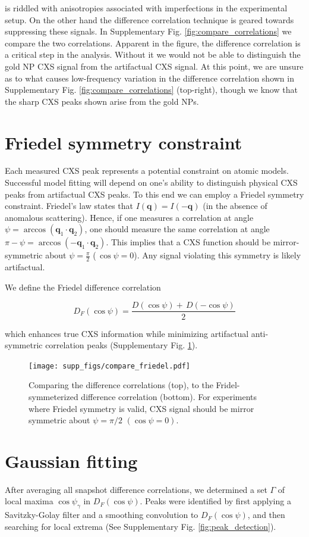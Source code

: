 \documentclass [12pt,fleqn]{article}
\def \be {\begin{equation}}
\def \ee {\end{equation}}
\begin{document}
is riddled with anisotropies associated with imperfections in the experimental setup. On the other hand the difference correlation technique is geared towards suppressing these signals. In  Supplementary Fig. \ref{fig:compare_correlations} we compare the two correlations. Apparent in the figure, the difference correlation is a critical step in the analysis. Without it we would not be able to distinguish the gold NP CXS signal from the artifactual CXS signal. At this point, we are unsure as to what causes low-frequency variation in the difference correlation shown in Supplementary Fig. \ref{fig:compare_correlations} (top-right), though we know that the sharp CXS peaks shown arise from the gold NPs.

\section{Friedel symmetry constraint} \label{supp:Friedel}
Each measured CXS peak represents a potential constraint on atomic models. Successful model fitting will depend on one's ability to distinguish physical CXS peaks from artifactual CXS peaks. To this end we can employ a Friedel symmetry constraint. Friedel's law \cite{friedel1913symetries} states that $I(\bm q) = I(-\bm q)$ (in the absence of anomalous scattering). Hence, if one measures a correlation at angle $\psi = \arccos ( \bm q_1 \cdot \bm q_2)$, one should measure the same correlation at angle $\pi - \psi = \arccos( -\bm q_1 \cdot \bm q_2)$. This implies that a CXS function should be mirror-symmetric about $\psi = \frac{\pi}{2}$ ($\,\cos \psi=0$). Any signal violating this symmetry is likely artifactual. 

We define the Friedel difference correlation 

\be
D_F(\cos \psi) = \frac{D(\cos \psi)  +\, D(-\cos \psi)}{2} 
\ee

which enhances true CXS information while minimizing artifactual anti-symmetric correlation peaks (Supplementary Fig. \ref{fig:compare_friedel}).

\begin{figure}[H]
\texttt{[image: supp\_figs/compare\_friedel.pdf]}
\caption{Comparing the difference correlations (top), to the Fridel-symmeterized difference correlation (bottom). For experiments where Friedel symmetry is valid, CXS signal should be mirror symmetric about $\psi = \pi/2\,\,(\cos \psi = 0)$.}
\label{fig:compare_friedel}
\end{figure}

\section{Gaussian fitting} \label{supp:Gauss}
After averaging all snapshot difference correlations, we determined a set $\Gamma$ of local maxima $\cos \psi_\gamma$ in $D_F(\cos \psi)$. Peaks were identified by first applying a Savitzky-Golay filter \cite{savitzky1964smoothing} and a smoothing convolution to $D_F(\cos \psi)$, and then searching for local extrema (See Supplementary Fig. \ref{fig:peak_detection}).
\end{document}
